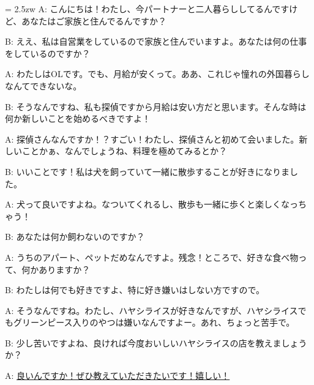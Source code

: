 \documentclass[11pt]{amsart}
\title{}
\author{}
\newenvironment{hangall}[1]{\hangindent = 2.5zw\everypar{\hangindent = 2.5zw}}{}
\begin{document}
\maketitle
\begin{hangall}{}%
A: こんにちは！わたし、今パートナーと二人暮らししてるんですけど、あなたはご家族と住んでるんですか？

B: ええ、私は自営業をしているので家族と住んでいますよ。あなたは何の仕事をしているのですか？

A: わたしはOLです。でも、月給が安くって。ああ、これじゃ憧れの外国暮らしなんてできないな。

B: そうなんですね、私も探偵ですから月給は安い方だと思います。そんな時は何か新しいことを始めるべきですよ！

A: 探偵さんなんですか！？すごい！わたし、探偵さんと初めて会いました。新しいことかぁ、なんでしょうね、料理を極めてみるとか？

B: いいことです！私は犬を飼っていて一緒に散歩することが好きになりました。

A: 犬って良いですよね。なついてくれるし、散歩も一緒に歩くと楽しくなっちゃう！

B: あなたは何か飼わないのですか？

A: うちのアパート、ペットだめなんですよ。残念！ところで、好きな食べ物って、何かありますか？

B: わたしは何でも好きですよ、特に好き嫌いはしない方ですので。

A: そうなんですね。わたし、ハヤシライスが好きなんですが、ハヤシライスでもグリーンピース入りのやつは嫌いなんですよー。あれ、ちょっと苦手で。

B: 少し苦いですよね、良ければ今度おいしいハヤシライスの店を教えましょうか？

A: \ul{良いんですか！ぜひ教えていただきたいです！嬉しい！}\end{hangall}
\end{document}

